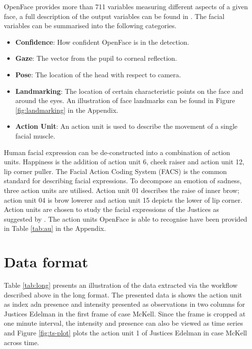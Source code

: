 \documentclass{monashthesis}
\begin{document}
OpenFace provides more than 711 variables measuring different aspects of a given face, a full description of the output variables can be found in \textcite{baltrusaitis2018openface}. The facial variables can be summarised into the following categories.

\begin{itemize}
\tightlist
\item
  \textbf{Confidence}: How confident OpenFace is in the detection.
\item
  \textbf{Gaze}: The vector from the pupil to corneal reflection.
\item
  \textbf{Pose}: The location of the head with respect to camera.
\item
  \textbf{Landmarking}: The location of certain characteristic points on the face and around the eyes. An illustration of face landmarks can be found in Figure \ref{fig:landmarking} in the Appendix.
\item
  \textbf{Action Unit}: An action unit is used to describe the movement of a single facial muscle.
\end{itemize}

Human facial expression can be de-constructed into a combination of action units. Happiness is the addition of action unit 6, cheek raiser and action unit 12, lip corner puller. The Facial Action Coding System (FACS) is the common standard for describing facial expressions. To decompose an emotion of sadness, three action units are utilised. Action unit 01 describes the raise of inner brow; action unit 04 is brow lowerer and action unit 15 depicts the lower of lip corner. Action units are chosen to study the facial expressions of the Justices as suggested by \textcite{kovalchik2018going}. The action units OpenFace is able to recognise have been provided in Table \ref{tab:au} in the Appendix.

\hypertarget{data-format}{%
\section{Data format}\label{data-format}}

Table \ref{tab:long} presents an illustration of the data extracted via the workflow described above in the long format. The presented data is shows the action unit as index adn presence and intensity presented as observations in two columns for Justices Edelman in the first frame of case McKell. Since the frame is cropped at one minute interval, the intensity and presence can also be viewed as time series and Figure \ref{fig:ts-plot} plots the action unit 1 of Justices Edelman in case McKell across time.
\end{document}

